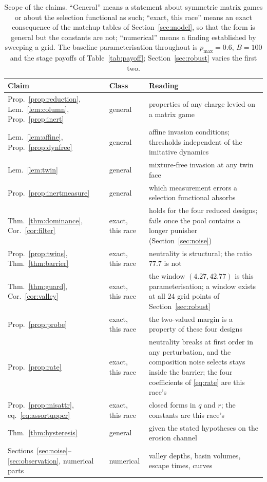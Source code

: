 \documentclass[11pt,a4paper]{article}
\theoremstyle{definition}
\begin{document}
\begin{table}[!ht]
\centering
\caption{Scope of the claims. ``General'' means a statement about symmetric
matrix games or about the selection functional as such; ``exact, this race''
means an exact consequence of the matchup tables of Section~\ref{sec:model},
so that the form is general but the constants are not; ``numerical'' means a
finding established by sweeping a grid. The baseline parameterisation
throughout is $p_{\max}=0.6$, $B=100$ and the stage payoffs of
Table~\ref{tab:payoff}; Section~\ref{sec:robust} varies the first two.}
\label{tab:scope}
\begin{tabular}{llp{6.6cm}}
\toprule
Claim & Class & Reading \\
\midrule
Prop.~\ref{prop:reduction}, Lem.~\ref{lem:column}, Prop.~\ref{prop:inert}
  & general & properties of any charge levied on a matrix game \\
Lem.~\ref{lem:affine}, Prop.~\ref{prop:dynfree}
  & general & affine invasion conditions; thresholds independent of the
    imitative dynamics \\
Lem.~\ref{lem:twin}
  & general & mixture-free invasion at any twin face \\
Prop.~\ref{prop:inertmeasure}
  & general & which measurement errors a selection functional absorbs \\
Thm.~\ref{thm:dominance}, Cor.~\ref{cor:filter}
  & exact, this race & holds for the four reduced designs; fails once the pool
    contains a longer punisher (Section~\ref{sec:noise}) \\
Prop.~\ref{prop:twins}, Thm.~\ref{thm:barrier}
  & exact, this race & neutrality is structural; the ratio $77.7$ is not \\
Thm.~\ref{thm:guard}, Cor.~\ref{cor:valley}
  & exact, this race & the window $(4.27,42.77)$ is this parameterisation;
    a window exists at all $24$ grid points of Section~\ref{sec:robust} \\
Prop.~\ref{prop:probe}
  & exact, this race & the two-valued margin is a property of these four
    designs \\
Prop.~\ref{prop:rate}
  & exact, this race & neutrality breaks at first order in any
    perturbation, and the composition noise selects stays inside the
    barrier; the four coefficients of \eqref{eq:rate} are this race's \\
Prop.~\ref{prop:misattr}, eq.~\eqref{eq:assortupper}
  & exact, this race & closed forms in $q$ and $r$; the constants are
    this race's \\
Thm.~\ref{thm:hysteresis}
  & general & given the stated hypotheses on the erosion channel \\
Sections~\ref{sec:noise}--\ref{sec:observation}, numerical parts
  & numerical & valley depths, basin volumes, escape times, curves \\
\bottomrule
\end{tabular}
\end{table}
\end{document}
